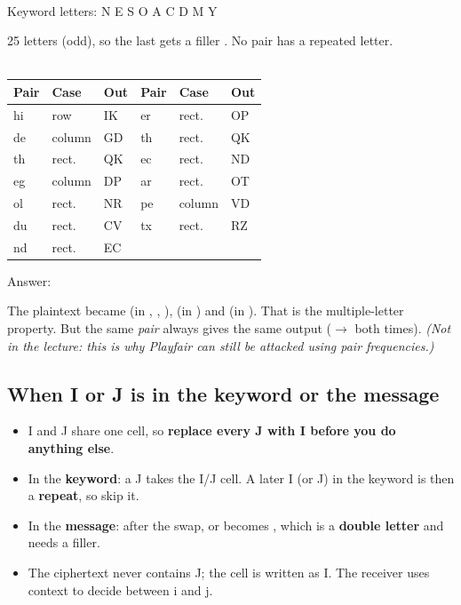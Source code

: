 \begin{minipage}[c]{0.36\textwidth}
\centering
{}\\[2pt]
{\footnotesize Keyword letters: N E S O A C D M Y}
\end{minipage}\hfill
\begin{minipage}[c]{0.6\textwidth}
25 letters (odd), so the last  gets a filler . No pair has a repeated letter.\\[3pt]
\\[3pt]
\small
\begin{tabular}{@{}lll|lll@{}}
\toprule
Pair & Case & Out & Pair & Case & Out\\
\midrule
hi & row & IK & er & rect. & OP\\
de & column & GD & th & rect. & QK\\
th & rect. & QK & ec & rect. & ND\\
eg & column & DP & ar & rect. & OT\\
ol & rect. & NR & pe & column & VD\\
du & rect. & CV & tx & rect. & RZ\\
nd & rect. & EC & & &\\
\bottomrule
\end{tabular}
\end{minipage}

\medskip
Answer: \textbf{}

The plaintext  became  (in , , ),  (in ) and  (in ). That is the multiple-letter property.
But the same \emph{pair} always gives the same output ($\to$ both times). \emph{(Not in the lecture: this is why Playfair can still be attacked using pair frequencies.)}

\subsection{When I or J is in the keyword or the message}
\begin{keybox}[title=I/J rules]
\begin{itemize}
  \item I and J share one cell, so \textbf{replace every J with I before you do anything else}.
  \item In the \textbf{keyword}: a J takes the I/J cell. A later I (or J) in the keyword is then a \textbf{repeat}, so skip it.
  \item In the \textbf{message}: after the swap,  or  becomes , which is a \textbf{double letter} and needs a filler.
  \item The ciphertext never contains J; the cell is written as I. The receiver uses context to decide between i and j.
\end{itemize}
\end{keybox}

